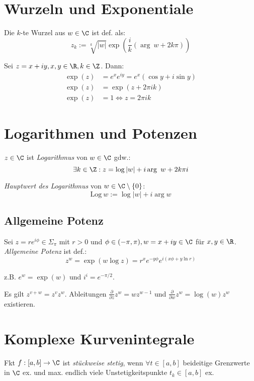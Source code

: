 \section*{Wurzeln und Exponentiale}

Die \(k\)-te Wurzel aus \(w \in \C\) ist def. als: \[z_k := \sqrt[k]{|w|} \exp\left(\frac{i}{k}(\arg \ w + 2k\pi)\right)\]

Sei \(z = x + iy, x, y \in \R, k \in \Z\). Dann:
\begin{align*}
	\exp(z) &= e^x e^{iy} = e^x(\cos y + i \sin y) \\
	\exp(z) &= \exp(z+2\pi ik) \\
	\exp(z) &= 1 \iff z=2\pi i k
\end{align*}

\section*{Logarithmen und Potenzen}

\(z \in \C\) ist \emph{Logarithmus} von \(w \in \C\) gdw.: \[\exists k \in \Z : z = \log |w| + i \arg \ w + 2k\pi i\]

\emph{Hauptwert des Logarithmus} von \(w \in \C \setminus \{0\}\): \[\text{Log} \ w := \log |w| + i \arg w\]

\subsection*{Allgemeine Potenz}

Sei \(z = re^{i\phi} \in \Sigma_\pi\) mit \(r > 0\) und \(\phi \in (-\pi,\pi), w = x + iy \in \C\) für \(x, y \in \R\). \emph{Allgemeine Potenz} ist def.:
\[z^w = \exp(w \log z) = r^x e^{-y\phi} e^{i(x\phi + y \ln r)}\]

z.B. \(e^w = \exp(w)\) und \(i^i = e^{-\pi/2}\).

\spacing

Es gilt \(z^{v+w} = z^v z^w\). Ableitungen \(\frac{\partial}{\partial z} z^w = wz^{w-1}\) und \(\frac{\partial}{\partial w} z^w = \log(w)z^w\) existieren.

\section*{Komplexe Kurvenintegrale}

Fkt \(f : [a,b] \to \C\) ist \emph{stückweise stetig}, wenn \(\forall t \in [a,b]\) beideitige Grenzwerte in \(\C\) ex. und max. endlich viele Unstetigkeitspunkte \(t_k \in [a,b]\) ex.

